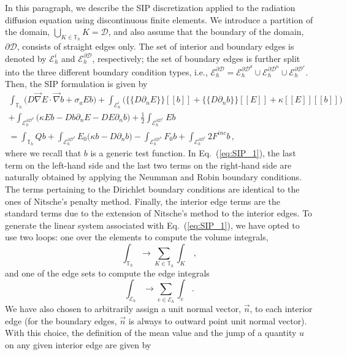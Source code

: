 \documentclass[preprint,10pt]{elsarticle}
\newcommand{\grad}{\vec{\nabla}}
\newcommand{\jmp}[1]{[\![#1]\!]}                     %
\newcommand{\mvl}[1]{\{\!\!\{#1\}\!\!\}}             %
\newcommand{\D}{\mathcal{D}}
\newcommand{\vn}{\vec{n}}
\newcommand{\EI}{\mathcal{E}_h^i}
\newcommand{\ED}{\mathcal{E}_h^{\partial \D^d}}
\newcommand{\EN}{\mathcal{E}_h^{\partial \D^n}}
\newcommand{\ER}{\mathcal{E}_h^{\partial \D^r}}
\newcommand{\eqt}[1]{Eq.~(\ref{#1})}                     %
\newcommand{\tf}{b}
\begin{document}
In this paragraph, we describe the SIP discretization \cite{DouglasN.Arnold2002,Kanschat2007} applied to the 
radiation diffusion equation using discontinuous finite elements. 
We introduce a partition
of the domain, $\bigcup\nolimits_{K\in \mathbb{T}_{h}}K=\D$, and also assume
that the boundary of the domain, $\partial \D$, consists of straight edges only. The 
set of interior and boundary edges is denoted by $\EI$ and $\mathcal{E}_h^{\partial\D}$,
respectively; the set of boundary edges is further split into the three different boundary 
condition types, i.e., $\mathcal{E}_h^{\partial\D} = \ED \cup \EN \cup \ER$. 
Then, the SIP formulation is given by
\begin{multline}
\label{eq:SIP_1}
\int_{\mathbb{T}_{h}} \Big( D \grad E \cdot \grad \tf + \sigma_a E \tf \Big)
+ \int_{\EI} \Big( \mvl{D\partial_n E} \jmp{\tf}  + \mvl{D\partial_n \tf} \jmp{E} + \kappa\jmp{E}\jmp{\tf} \Big)
\\
+ \int_{\ED} \Big( \kappa E \tf -D\tf \partial_n E  -D E \partial_n \tf \Big)
+ \frac{1}{2} \int_{\ER}  E \tf  
\\
=
\int_{\mathbb{T}_{h}} Q \tf 
+ \int_{\ED} E_0 \Big( \kappa \tf  -D \partial_n \tf  \Big)
- \int_{\EN} F_0 \tf  
+ \int_{\ER} 2 F^{inc} \tf  \, ,
\end{multline}
where we recall that $\tf$ is a generic test function. 
In \eqt{eq:SIP_1}, the last term on the left-hand side and the last two terms on the right-hand side 
are naturally obtained by applying the Neumman and Robin boundary conditions. The terms pertaining 
to the Dirichlet boundary conditions are identical to the ones of Nitsche's penalty method. 
Finally, the interior edge terms are the standard terms due to the extension of Nitsche's method to 
the interior edges.
To generate the linear system associated with \eqt{eq:SIP_1}, 
we have opted to use two loops: one over the elements to compute the volume integrals,
\begin{equation}
\int_{\mathbb{T}_{h}} \longrightarrow \sum_{K \in \mathbb{T}_{h}} \int_{K} \, ,
\end{equation}
and one of the edge sets to compute the edge integrals
\begin{equation}
\int_{\mathcal{E}_h} \longrightarrow \sum_{e \in \mathcal{E}_h} \int_{e} \, .
\end{equation}
We have also chosen to arbitrarily assign a unit normal vector, $\vn$, to each interior edge (for the boundary edges,
$\vn$ is always to outward point unit normal vector). With this choice, the definition of the mean value and the jump of a quantity $u$ on any given interior edge are given by
\end{document}
